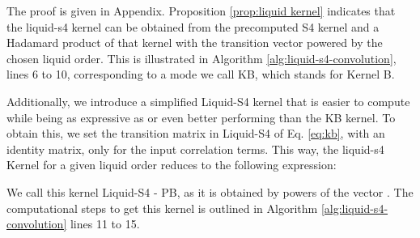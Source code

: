 \documentclass{MITcsail}
\begin{document}
The proof is given in Appendix. Proposition \ref{prop:liquid kernel} indicates that the liquid-s4 kernel can be obtained from the precomputed S4 kernel and a Hadamard product of that kernel with the transition vector  powered by the chosen liquid order. This is illustrated in Algorithm \ref{alg:liquid-s4-convolution}, lines 6 to 10, corresponding to a mode we call KB, which stands for Kernel  B.

Additionally, we introduce a simplified Liquid-S4 kernel that is easier to compute while being as expressive as or even better performing than the KB kernel. To obtain this, we set the transition matrix  in Liquid-S4 of Eq. \ref{eq:kb}, with an identity matrix, only for the input correlation terms. This way, the liquid-s4 Kernel for a given liquid order  reduces to the following expression: 



We call this kernel Liquid-S4 - PB, as it is obtained by powers of the vector . The computational steps to get this kernel is outlined in Algorithm \ref{alg:liquid-s4-convolution} lines 11 to 15.



\end{document}
